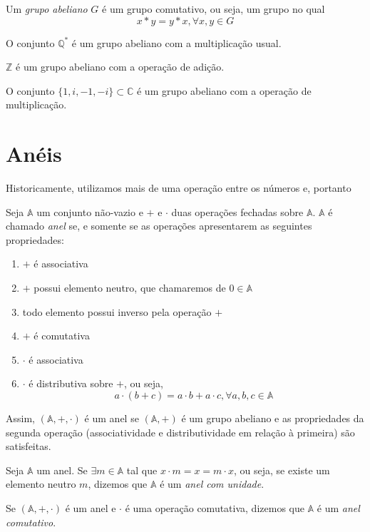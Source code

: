 \begin{df}
Um \emph{grupo abeliano} $G$ é um grupo comutativo, ou seja, um grupo no qual
\[x*y=y*x, \forall x,y \in G\]
\end{df}
\begin{exemplo}
O conjunto $\mathbb{Q}^*$ é um grupo abeliano com a multiplicação usual. \par $\mathbb{Z}$ é um grupo abeliano com a operação de adição. \par O conjunto $\{1,i,-1,-i\}\subset\mathbb{C}$ é um grupo abeliano com a operação de multiplicação.
\end{exemplo}

\section{Anéis}
Historicamente, utilizamos mais de uma operação entre os números e, portanto %
\begin{df}
Seja $\mathbb{A}$ um conjunto não-vazio e $+$ e $\cdot$ duas operações fechadas sobre $\mathbb{A}$. $\mathbb{A}$ é chamado \emph{anel} se, e somente se as operações apresentarem as seguintes propriedades:
\begin{enumerate}
\item $+$ é associativa
\item $+$ possui elemento neutro, que chamaremos de $0\in \mathbb{A}$
\item todo elemento possui inverso pela operação $+$
\item $+$ é comutativa
\item $\cdot$ é associativa
\item $\cdot$ é distributiva sobre $+$, ou seja, \[a\cdot (b+c) = a\cdot b + a\cdot c, \forall a,b,c \in \mathbb{A}\]
\end{enumerate}
Assim, $(\mathbb{A},+,\cdot)$ é um anel se $(\mathbb{A},+)$ é um grupo abeliano e as propriedades da segunda operação (associatividade e distributividade em relação à primeira) são satisfeitas.
\end{df}

\begin{df}
Seja $\mathbb{A}$ um anel. Se $\exists m\in \mathbb{A}$ tal que $x\cdot m = x = m \cdot x$, ou seja, se existe um elemento neutro $m$, dizemos que $\mathbb{A}$ é um \emph{anel com unidade}.
\end{df}

\begin{df}
Se $(\mathbb{A},+,\cdot)$ é um anel e $\cdot$ é uma operação comutativa, dizemos que $\mathbb{A}$ é um \emph{anel comutativo}.
\end{df}

